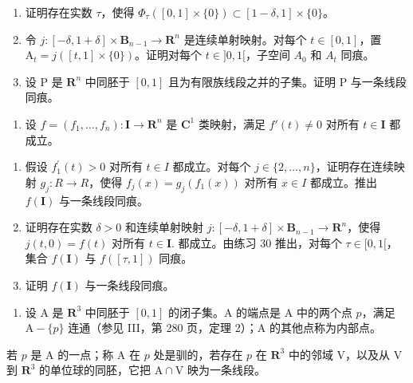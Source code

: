 \begin{enumerate}
\def\labelenumi{\alph{enumi})}
\item
  证明存在实数 \(\tau\)，使得 \(\Phi_{\tau}([0,1] \times \{0\}) \subset [1 - \delta, 1] \times \{0\}\)。
\item
  令 \(j\colon[-\delta,1+\delta]\times\mathbf{B}_{n-1}\to\mathbf{R}^{n}\) 是连续单射映射。对每个 \(t\in[0,1]\)，置 \(\mathrm{A}_{t}=j([t,1]\times\{0\})\)。证明对每个 \(t\in]0,1[\)，子空间 \(A_{0}\) 和 \(A_{t}\) 同痕。
\item
  设 P 是 \(\mathbf{R}^{n}\) 中同胚于 \([0,1]\) 且为有限族线段之并的子集。证明 P 与一条线段同痕。
\end{enumerate}

\begin{enumerate}
\def\labelenumi{\arabic{enumi})}
\setcounter{enumi}{30}
\tightlist
\item
  设 \(f = (f_1, \ldots, f_n) \colon \mathbf{I} \to \mathbf{R}^n\) 是 \(\mathbf{C}^1\) 类映射，满足 \(f'(t) \neq 0\) 对所有 \(t \in \mathbf{I}\) 都成立。
\end{enumerate}

\begin{enumerate}
\def\labelenumi{\alph{enumi})}
\item
  假设 \(f_{1}^{\prime}(t) > 0\) 对所有 \(t \in I\) 都成立。对每个 \(j \in \{2, \ldots, n\}\)，证明存在连续映射 \(g_{j} \colon R \to R\)，使得 \(f_{j}(x) = g_{j}(f_{1}(x))\) 对所有 \(x \in I\) 都成立。推出 \(f(\mathbf{I})\) 与一条线段同痕。
\item
  证明存在实数 \(\delta > 0\) 和连续单射映射 \(j\colon [-\delta, 1 + \delta] \times \mathbf{B}_{n-1} \to \mathbf{R}^n\)，使得 \(j(t, 0) = f(t)\) 对所有 \(t \in \mathbf{I} .\) 都成立。由练习 30 推出，对每个 \(\tau \in [0, 1[\)，集合 \(f(\mathbf{I})\) 与 \(f([\tau, 1])\) 同痕。
\item
  证明 \(f(\mathbf{I})\) 与一条线段同痕。
\end{enumerate}

\begin{enumerate}
\def\labelenumi{\arabic{enumi})}
\setcounter{enumi}{31}
\tightlist
\item
  设 A 是 \(\mathbf{R}^3\) 中同胚于 \([0,1]\) 的闭子集。A 的端点是 A 中的两个点 \(p\)，满足 \(\mathrm{A} - \{p\}\) 连通（参见 III，第 280 页，定理 2）；A 的其他点称为内部点。
\end{enumerate}

若 \(p\) 是 A 的一点；称 A 在 \(p\) 处是驯的，若存在 \(p\) 在 \(\mathbf{R}^3\) 中的邻域 V，以及从 V 到 \(\mathbf{R}^3\) 的单位球的同胚，它把 \(\mathrm{A} \cap \mathrm{V}\) 映为一条线段。

